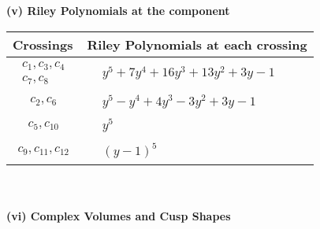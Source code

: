 \documentclass[1p]{elsarticle_modified}
\theoremstyle{definition}
\begin{document}
\newpage\renewcommand{\arraystretch}{1}
\flushleft \textbf{(v) Riley Polynomials at the component}\newline \\
\begin{tabular}{m{50pt}|m{274pt}}
Crossings & \hspace{64pt}Riley Polynomials at each crossing \\
\hline $$\begin{aligned}c_{1},c_{3},c_{4}\\c_{7},c_{8}\end{aligned}$$&$\begin{aligned}
&y^5+7 y^4+16 y^3+13 y^2+3 y-1
\end{aligned}$\\
\hline $$\begin{aligned}c_{2},c_{6}\end{aligned}$$&$\begin{aligned}
&y^5- y^4+4 y^3-3 y^2+3 y-1
\end{aligned}$\\
\hline $$\begin{aligned}c_{5},c_{10}\end{aligned}$$&$\begin{aligned}
&y^5
\end{aligned}$\\
\hline $$\begin{aligned}c_{9},c_{11},c_{12}\end{aligned}$$&$\begin{aligned}
&(y-1)^5
\end{aligned}$\\
\hline
\end{tabular}\\~\\
\newpage\flushleft \textbf{(vi) Complex Volumes and Cusp Shapes}
\end{document}
